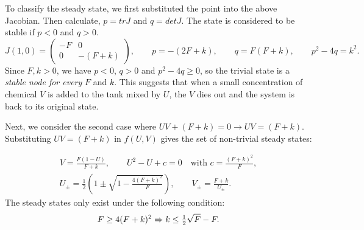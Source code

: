 \documentclass[a4paper, 11pt]{article}
\begin{document}
To classify the steady state, we first substituted the point into the above Jacobian. Then calculate, $p = tr J$ and $q = det J$. The state is considered to be stable if $p < 0$ and $q > 0$.
\begin{equation}
	\label{eq:gs-jacobian-trivial}
	J(1, 0) =
	\begin{pmatrix}
		-F & 0        \\
		0  & -(F + k)
	\end{pmatrix},
	\qquad p = -(2F + k), \qquad q = F(F + k), \qquad p^2 - 4q = k^2 .
\end{equation}
Since $F, k > 0$, we have $p < 0$, $q > 0$ and $p^2 - 4q \geq 0$, so the trivial state is a \emph{stable node for every} $F$ and $k$. This suggests that when a small concentration of chemical $V$  is added to the tank mixed by $U$, the $V$ dies out and the system is back to its original state.

Next, we consider the second case where $UV + (F + k) = 0 \rightarrow UV = (F + k)$. Substituting $UV = (F + k)$ in $f(U,V)$ gives the set of non-trivial steady states:

\begin{equation}
	\label{eq:gs-nontrivial}
	\begin{gathered}
		V = \frac{F(1 - U)}{F + k}, \qquad
		U^2 - U + c = 0 \quad \text{with } c = \frac{(F + k)^2}{F}, \\[4pt]
		U_\pm = \frac{1}{2}\left(1 \pm \sqrt{1 - \frac{4(F + k)^2}{F}}\right), \qquad
		V_\pm = \frac{F + k}{U_\pm}.
	\end{gathered}
\end{equation}
The steady states only exist under the following condition:
\begin{equation}
	\label{eq:saddle-node}
	F \ge 4(F + k)^2 \Rightarrow k \leq \tfrac{1}{2}\sqrt{F} - F .
\end{equation}


%
\end{document}
